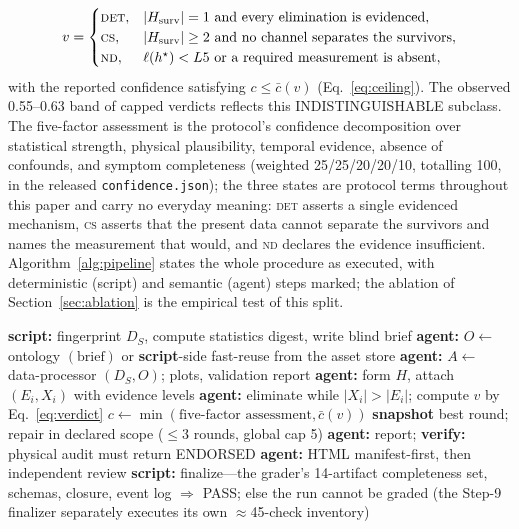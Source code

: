 \documentclass[preprint,12pt]{elsarticle}
\begin{document}
\begin{equation}
v = \begin{cases}
\textsc{det}, & |H_{\mathrm{surv}}| = 1 \ \text{and every elimination is evidenced},\\
\textsc{cs}, & |H_{\mathrm{surv}}| \ge 2 \ \text{and no channel separates the survivors},\\
\textsc{nd}, & \ell(h^\star) < L5 \ \text{or a required measurement is absent},
\end{cases}
\label{eq:verdict}
\end{equation}
with the reported confidence satisfying $c \le \bar{c}(v)$ (Eq.~\eqref{eq:ceiling}). The observed 0.55--0.63 band of capped verdicts reflects this INDISTINGUISHABLE subclass. The five-factor assessment is the protocol's confidence decomposition over statistical strength, physical plausibility, temporal evidence, absence of confounds, and symptom completeness (weighted 25/25/20/20/10, totalling 100, in the released \texttt{confidence.json}); the three states are protocol terms throughout this paper and carry no everyday meaning: \textsc{det} asserts a single evidenced mechanism, \textsc{cs} asserts that the present data cannot separate the survivors and names the measurement that would, and \textsc{nd} declares the evidence insufficient. Algorithm~\ref{alg:pipeline} states the whole procedure as executed, with deterministic (script) and semantic (agent) steps marked; the ablation of Section~\ref{sec:ablation} is the empirical test of this split.

\begin{algorithm}[!t]
\caption{IDD diagnosis of scenario $S$ (script = deterministic code, agent = semantic reasoning; gates as in Table~\ref{tab:checkpoints})}
\label{alg:pipeline}
\begin{algorithmic}[1]
\State \textbf{script:} fingerprint $D_S$, compute statistics digest, write blind brief 
\State \textbf{agent:} $O \leftarrow$ ontology $(\text{brief})$ or \textbf{script}-side fast-reuse from the asset store 
\State \textbf{agent:} $A \leftarrow$ data-processor $(D_S, O)$; plots, validation report 
\State \textbf{agent:} form $H$, attach $(E_i, X_i)$ with evidence levels 
\State \textbf{agent:} eliminate while $|X_i| > |E_i|$; compute $v$ by Eq.~\eqref{eq:verdict}
\State $c \leftarrow \min(\text{five-factor assessment}, \bar{c}(v))$ 
 \textbf{snapshot} best round; repair in declared scope ($\le 3$ rounds, global cap 5)
\EndIf {}
\State \textbf{agent:} report; \textbf{verify:} physical audit must return ENDORSED 
\State \textbf{agent:} HTML manifest-first, then independent review 
\State \textbf{script:} finalize---the grader's 14-artifact completeness set, schemas, closure, event log $\Rightarrow$ PASS; else the run cannot be graded (the Step-9 finalizer separately executes its own $\approx$45-check inventory)
\end{algorithmic}
\end{algorithm}
\end{document}
